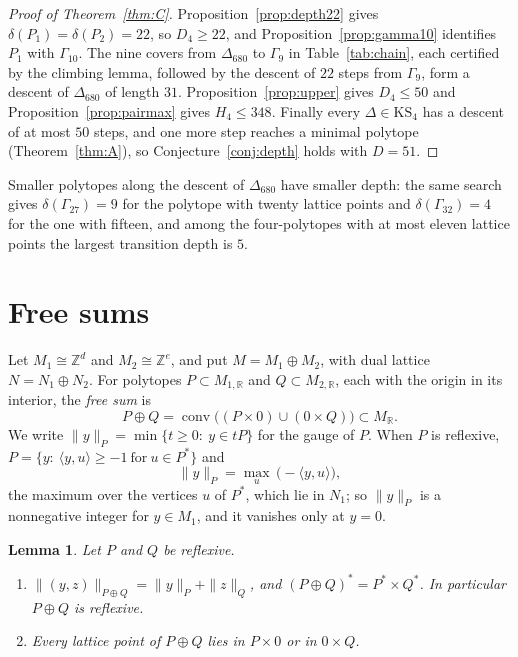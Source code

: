 \documentclass[11pt]{amsart}
\newtheorem{lemma}[theorem]{Lemma}
\theoremstyle{definition}
\theoremstyle{remark}
\newcommand{\R}{\mathbb{R}}
\newcommand{\Z}{\mathbb{Z}}
\newcommand{\KS}{\mathrm{KS}}
\newcommand{\ip}[2]{\langle #1,#2\rangle}
\newcommand{\conv}{\operatorname{conv}}
\newcommand{\Dbig}{\Delta_{680}}
\newcommand{\UB}{348}
\newcommand{\LB}{22}
\newcommand{\DUB}{31}
\newcommand{\UBs}{50}
\begin{document}
\begin{proof}[Proof of Theorem~\ref{thm:C}]
Proposition~\ref{prop:depth22} gives $\delta(P_1)=\delta(P_2)=\LB$, so
$D_4\ge\LB$, and Proposition~\ref{prop:gamma10} identifies $P_1$ with
$\Gamma_{10}$. The nine covers from $\Dbig$ to $\Gamma_9$ in
Table~\ref{tab:chain}, each certified by the climbing lemma, followed by
the descent of $22$ steps from $\Gamma_9$, form a descent of $\Dbig$ of
length $\DUB$. Proposition~\ref{prop:upper} gives $D_4\le\UBs$ and
Proposition~\ref{prop:pairmax} gives $H_4\le\UB$. Finally every
$\Delta\in\KS_4$ has a descent of at most $\UBs$ steps, and one more step
reaches a minimal polytope (Theorem~\ref{thm:A}), so
Conjecture~\ref{conj:depth} holds with $D=51$.
\end{proof}

Smaller polytopes along the descent of $\Dbig$ have smaller depth: the
same search gives $\delta(\Gamma_{27})=9$ for the polytope with twenty
lattice points and $\delta(\Gamma_{32})=4$ for the one with fifteen, and
among the four-polytopes with at most eleven lattice points the largest
transition depth is $5$.

\section{Free sums}\label{sec:freesum}

Let $M_1\cong\Z^d$ and $M_2\cong\Z^e$, and put $M=M_1\oplus M_2$, with
dual lattice $N=N_1\oplus N_2$. For polytopes $P\subset M_{1,\R}$ and
$Q\subset M_{2,\R}$, each with the origin in its interior, the
\emph{free sum} is
\[
P\oplus Q=\conv\bigl((P\times0)\cup(0\times Q)\bigr)\subset M_\R .
\]
We write $\|y\|_P=\min\{t\ge0:\ y\in tP\}$ for the gauge of $P$. When $P$
is reflexive, $P=\{y:\ \ip{y}{u}\ge-1\ \text{for}\ u\in P^*\}$ and
\begin{equation}\label{eq:gauge}
\|y\|_P=\max_{u}\,\bigl(-\ip{y}{u}\bigr),
\end{equation}
the maximum over the vertices $u$ of $P^*$, which lie in $N_1$; so
$\|y\|_P$ is a nonnegative integer for $y\in M_1$, and it vanishes only at
$y=0$.

\begin{lemma}\label{lem:freesum}
Let $P$ and $Q$ be reflexive.
\begin{enumerate}
\item $\|(y,z)\|_{P\oplus Q}=\|y\|_P+\|z\|_Q$, and
$(P\oplus Q)^*=P^*\times Q^*$. In particular $P\oplus Q$ is reflexive.
\item Every lattice point of $P\oplus Q$ lies in $P\times0$ or in
$0\times Q$.
\end{enumerate}
\end{lemma}
\end{document}
